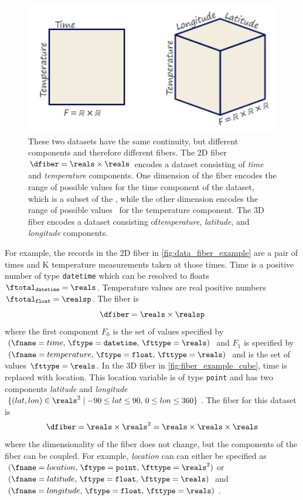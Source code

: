 \documentclass[../main.tex]{subfiles}
\begin{document}
\begin{figure}[H]
    \includegraphics[width=1\textwidth]{figures/math/fiber.png}
    \caption{These two datasets have the same continuity, but different components and therefore different fibers. The 2D fiber \(\dfiber=\reals\times\reals\) encodes a dataset consisting of \textit{time} and \textit{temperature} components.  One dimension of the fiber encodes the range of possible values for the time component of the dataset, which is a subset of the \reals, while the other dimension encodes the range of possible values  \reals\ for the temperature component. The 3D fiber encodes a dataset consisting of\textit{temperature}, \textit{latitude}, and \textit{longitude} components.}
    \label{fig:data_fiber_example}
\end{figure}

For example, the records in the 2D fiber in \autoref{fig:data_fiber_example} are a pair of times and \textdegree K temperature measurements taken at those times. Time is a positive number of type \texttt{datetime} which can be resolved to floats $\ftotal_{\texttt{datetime}}= \reals$. Temperature values are real positive numbers $\ftotal_{\texttt{float}} = \realsp$. The fiber is 
\begin{equation*}
    \dfiber =  \reals \times \realsp 
\end{equation*} 
where the first component $F_0$ is the set of values specified by $(\fname=time,\, \ftype=\texttt{datetime},\, \fttype=\reals)$ and $F_1$ is specified by $(\fname=temperature,\, \ftype=\texttt{float},\, \fttype=\reals)$ and is the set of values $\fttype=\reals$. In the 3D fiber in \autoref{fig:fiber_example_cube}, time is replaced with location. This location variable is of type \texttt{point} and has two components \textit{latitude} and \textit{longitude} $\{(lat,lon) \in \reals^{2} \mid  -90\leq lat \leq 90,\, 0 \leq lon \leq 360\}$. The fiber for this dataset is
\begin{equation*}
    \dfiber = \reals \times \reals^{2} = \reals \times \reals \times \reals
\end{equation*} 
where the dimensionality of the fiber does not change, but the components of the fiber can be coupled. For example, \textit{location} can can either be specified as \((\fname = location,\, \ftype = \texttt{point},\, \fttype=\reals^{2})\)or \((\fname=latitude,\, \ftype=\texttt{float}, \, \fttype=\reals)\) and \((\fname=longitude,\, \ftype=\texttt{float},\,\fttype=\reals)\).  
\end{document}
